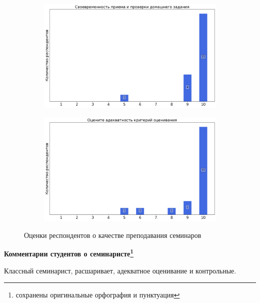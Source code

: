 \begin{figure}[H]
			\begin{subfigure}[b]{0.45\textwidth}
				\centering
				\includegraphics[width=\textwidth]{images/3 course/Вычислительная математика/seminarists-marks-Фаворская А.В.-2.png}
			\end{subfigure}
			\begin{subfigure}[b]{0.45\textwidth}
				\centering
				\includegraphics[width=\textwidth]{images/3 course/Вычислительная математика/seminarists-marks-Фаворская А.В.-3.png}
			\end{subfigure}	
			\caption{Оценки респондентов о качестве преподавания семинаров}
		\end{figure}

		\textbf{Комментарии студентов о семинаристе\protect\footnote{сохранены оригинальные орфография и пунктуация}}
            \begin{commentbox} 
                Классный семинарист, расшаривает, адекватное оценивание и контрольные. 
            \end{commentbox} 

